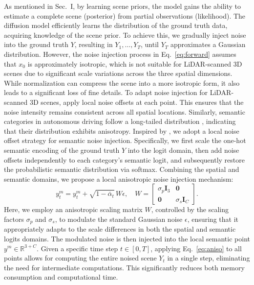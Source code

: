 \documentclass[conference]{IEEEtran}
\begin{document}
As mentioned in Sec.~I, by learning scene priors, the model gains the ability to estimate a complete scene (posterior) from partial observations (likelihood).
The diffusion model efficiently learns the distribution of the ground truth data, acquiring knowledge of the scene prior.
To achieve this, we gradually inject noise into the ground truth $Y$, resulting in $Y_1, \ldots, Y_T$, until $Y_T$ approximates a Gaussian distribution.
However, the noise injection process in Eq.~\eqref{eq:forward} assumes that $x_0$ is approximately isotropic, which is not suitable for LiDAR-scanned 3D scenes due to significant scale variations across the three spatial dimensions.
While normalization can compress the scene into a more isotropic form, it also leads to a significant loss of fine details.
To adapt noise injection for LiDAR-scanned 3D scenes, \cite{zxia2024} apply local noise offsets at each point.
This ensures that the noise intensity remains consistent across all spatial locations.
Similarly, semantic categories in autonomous driving follow a long-tailed distribution \cite{wwu}, indicating that their distribution exhibits anisotropy.
Inspired by \cite{zxia2024}, we adopt a local noise offset strategy for semantic noise injection.
Specifically, we first scale the one-hot semantic encoding of the ground truth $Y$ into the logit domain, then add noise offsets independently to each category's semantic logit, and subsequently restore the probabilistic semantic distribution via softmax.
Combining the spatial and semantic domains, we propose a local anisotropic noise injection mechanism:
\begin{equation}
  y_t^m = y_t^m + \sqrt{1 - \bar{\alpha}_t}\, W\epsilon, \quad
  W = \begin{bmatrix} \sigma_p \mathbf{I}_3 & \mathbf{0} \\ \mathbf{0} & \sigma_s \mathbf{I}_C \end{bmatrix}.
  \label{eq:aniso}
\end{equation}
Here, we employ an anisotropic scaling matrix $W$, controlled by the scaling factors $\sigma_p$ and $\sigma_s$, to modulate the standard Gaussian noise $\epsilon$, ensuring that it appropriately adapts to the scale differences in both the spatial and semantic logits domains.
The modulated noise is then injected into the local semantic point $y^m \in \mathbb{R}^{3+C}$.
Given a specific time step $t \in [0, T]$, applying Eq.~\eqref{eq:aniso} to all points allows for computing the entire noised scene $Y_t$ in a single step, eliminating the need for intermediate computations.
This significantly reduces both memory consumption and computational time.
\end{document}
